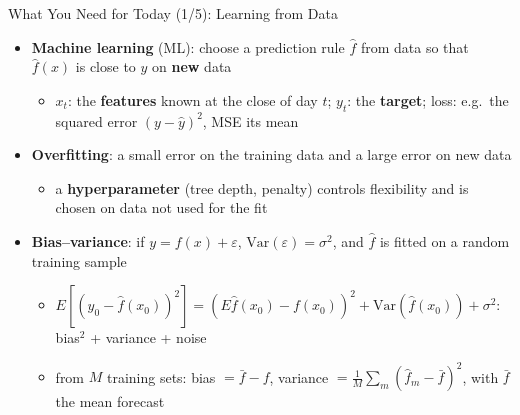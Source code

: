\begin{frame}{What You Need for Today (1/5): Learning from Data}
\itemsize{\small}
\begin{itemize}
    \item \textbf{Machine learning} (ML): choose a prediction rule $\hat f$ from data so that $\hat f(x)$ is close to $y$ on \textbf{new} data
    \begin{itemize}
        \item $x_t$: the \textbf{features} known at the close of day $t$; $y_t$: the \textbf{target}; loss: e.g.\ the squared error $(y - \hat y)^2$, MSE its mean
    \end{itemize}
    \item \textbf{Overfitting}: a small error on the training data and a large error on new data
    \begin{itemize}
        \item a \textbf{hyperparameter} (tree depth, penalty) controls flexibility and is chosen on data not used for the fit
    \end{itemize}
    \item \textbf{Bias--variance}: if $y = f(x) + \varepsilon$, $\mathrm{Var}(\varepsilon) = \sigma^2$, and $\hat f$ is fitted on a random training sample
    \begin{itemize}
        \item $E[(y_0 - \hat f(x_0))^2] = (E\hat f(x_0) - f(x_0))^2 + \mathrm{Var}(\hat f(x_0)) + \sigma^2$: bias$^2$ + variance + noise
        \item from $M$ training sets: bias $= \bar f - f$, variance $= \frac1M\sum_m (\hat f_m - \bar f)^2$, with $\bar f$ the mean forecast
    \end{itemize}
\end{itemize}
\end{frame}

